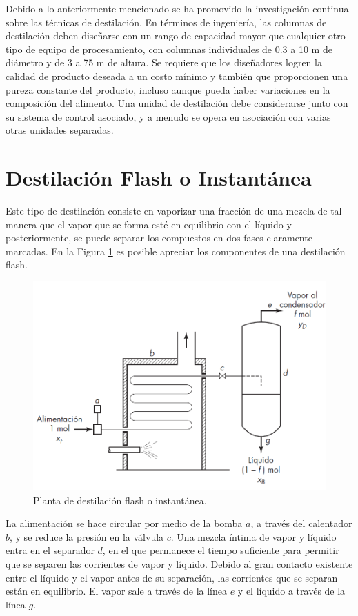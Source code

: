 \documentclass[11pt]{book}
\begin{document}
Debido a lo anteriormente mencionado se ha promovido la investigación continua sobre las técnicas de destilación. En términos de ingeniería, las columnas de destilación deben diseñarse con un rango de capacidad mayor que cualquier otro tipo de equipo de procesamiento, con columnas individuales de 0.3 a 10 m de diámetro y de 3 a 75 m de altura. Se requiere que los diseñadores logren la calidad de producto deseada a un costo mínimo y también que proporcionen una pureza constante del producto, incluso aunque pueda haber variaciones en la composición del alimento. Una unidad de destilación debe considerarse junto con su sistema de control asociado, y a menudo se opera en asociación con varias otras unidades separadas.

\section{Destilación Flash o Instantánea}

Este tipo de destilación consiste en vaporizar una fracción de una mezcla de tal manera que el vapor que se forma esté en equilibrio con el líquido y posteriormente, se puede separar los compuestos en dos fases claramente marcadas. En la Figura \ref{fig:DestilacionFlash_1} es posible apreciar los componentes de una destilación flash.

\begin{figure}[H]
    \centering
    \includegraphics[width = 0.65\linewidth]{img/destilacion/DestilacionFlash_1.PNG}
    \caption{Planta de destilación flash o instantánea.}
    \label{fig:DestilacionFlash_1}
\end{figure}

La alimentación se hace circular por medio de la bomba $a$, a través del calentador $b$, y se reduce la presión en la válvula $c$. Una mezcla íntima de vapor y líquido entra en el separador $d$, en el que permanece el tiempo suficiente para permitir que se separen las corrientes de vapor y líquido. Debido al gran contacto existente entre el líquido y el vapor antes de su separación, las corrientes que se separan están en equilibrio. El vapor sale a través de la línea $e$ y el líquido a través de la línea $g$.
\end{document}
